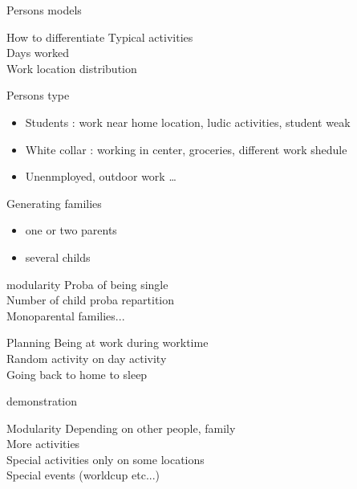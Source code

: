 \begin{frame}{Persons models}
\begin{block}{How to differentiate}
Typical activities\\
Days worked \\
Work location distribution
\end{block}

\begin{alertblock}{Persons type}
\begin{itemize}
\item Students : work near home location, ludic activities, student weak
\item White collar : working in center, groceries, different work shedule
\item Unenmployed, outdoor work \ldots
\end{itemize}

\end{alertblock}

\end{frame}


\begin{frame}{Generating families}
\begin{itemize}
\item one or two parents
\item several childs 
\end{itemize}

\begin{alertblock}{modularity}
Proba of being single\\
Number of child proba repartition\\
Monoparental families...
\end{alertblock}
\end{frame}

\begin{frame}{Planning}
Being at work during worktime\\
Random activity on day activity\\
Going back to home to sleep\\
\begin{block}{demonstration}
\end{block}
\begin{alertblock}{Modularity}
Depending on other people, family\\
More activities\\
Special activities only on some locations\\
Special events (worldcup etc...)
\end{alertblock}
\end{frame}

